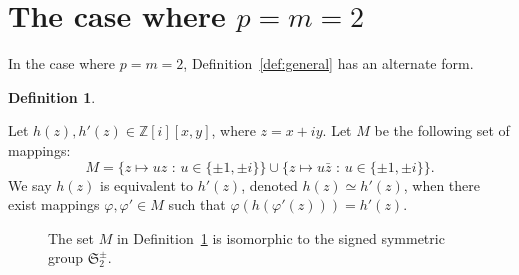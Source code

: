 \documentclass[12pt,table]{article}
\theoremstyle{definition}
\newtheorem{definition}[theorem]{Definition}
\theoremstyle{remark}
\newcommand{\Zzz}{\mathbb Z}
\numberwithin{equation}{section}
\begin{document}
\section{The case where $ p = m = 2$}


In the case where $ p = m = 2$, Definition~\ref{def:general} has an alternate form.



\begin{definition}
\label{def:2D}

Let $ h(z), h'(z) \in \Zzz [i][x,y] $,
where $ z = x + iy $.
Let $ M $ be the following set of mappings: 
\[
M = \{ z \mapsto uz \text{ : } u \in \{ \pm 1, \pm i \} \}  
\cup \{ z\mapsto u \bar{z} \text{ : } u \in \{ \pm 1, \pm i \} \}.  
\]
We say $ h(z) $ is equivalent to $ h'(z) $,
denoted $ h(z) \simeq h'(z) $,
when there exist mappings $ \varphi, \varphi' \in M $
such that $ \varphi( h( \varphi'( z ) ) )  = h'(z) $.



\end{definition}



\begin{figure}[h]


\begin{center}

\end{center}

\caption{
The set $M$ in Definition~\ref{def:2D} is isomorphic to
the signed symmetric group $ \mathfrak{S}_2^\pm $.
}
 
\label{fig:2D_transformations}
 
\end{figure}
\end{document}
